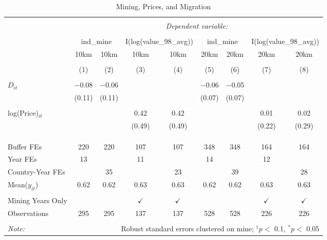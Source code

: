 
\begin{table}[ht!] \centering 
  \caption{Mining, Prices, and Migration} 
  \label{tab:did_dhs_migration} 
\begin{tabular}{@{\extracolsep{0pt}}lcccccccc} 
\\[-1.8ex]\hline 
\hline \\[-1.8ex] 
 & \multicolumn{8}{c}{\textit{Dependent variable:}} \\ 
\cline{2-9} 
\\[-1.8ex] & \multicolumn{2}{c}{ind\_mine} & \multicolumn{2}{c}{I(log(value\_98\_avg))} & \multicolumn{2}{c}{ind\_mine} & \multicolumn{2}{c}{I(log(value\_98\_avg))} \\ 
 & 10km & 10km & 10km & 10km & 20km & 20km & 20km & 20km \\ 
\\[-1.8ex] & (1) & (2) & (3) & (4) & (5) & (6) & (7) & (8)\\ 
\hline \\[-1.8ex] 
 $D_{it}$ & $-$0.08 & $-$0.06 &  &  & $-$0.06 & $-$0.05 &  &  \\ 
  & (0.11) & (0.11) &  &  & (0.07) & (0.07) &  &  \\ 
  & & & & & & & & \\ 
 log(Price)$_{it}$ &  &  & 0.42 & 0.42 &  &  & 0.01 & 0.02 \\ 
  &  &  & (0.49) & (0.49) &  &  & (0.22) & (0.29) \\ 
  & & & & & & & & \\ 
\hline \\[-1.8ex] 
\hline \\[-1.8ex] Buffer FEs & 220 & 220 & 107 & 107 & 348 & 348 & 164 & 164 \\ 
Year FEs & 13 &  & 11 &  & 14 &  & 12 &  \\ 
Country-Year FEs &  & 35 &  & 23 &  & 39 &  & 28 \\ 
Mean($y_{it}$) & 0.62 & 0.62 & 0.63 & 0.63 & 0.62 & 0.62 & 0.63 & 0.63 \\ 
\hline \\[-1.8ex] Mining Years Only &  &  & $\checkmark$ & $\checkmark$ &  &  & $\checkmark$ & $\checkmark$ \\ 
Observations & 295 & 295 & 137 & 137 & 528 & 528 & 226 & 226 \\ 
\hline 
\hline \\[-1.8ex] 
\textit{Note:}  & \multicolumn{8}{r}{Robust standard errors clustered on mine; $^{\dagger} p <$ 0.1, $^*p <$ 0.05} \\ 
\end{tabular} 
\end{table} 
